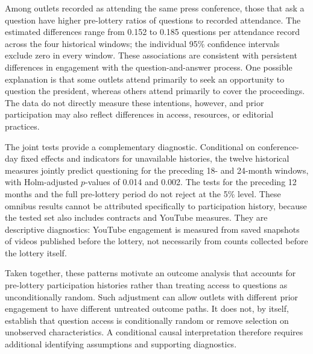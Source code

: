 Among outlets recorded as attending the same press conference, those that ask
a question have higher pre-lottery ratios of questions to recorded attendance.
The estimated differences range from 0.152 to 0.185 questions per attendance
record across the four historical windows; the individual 95\% confidence
intervals exclude zero in every window. These associations are consistent with
persistent differences in engagement with the question-and-answer process.
One possible explanation is that some outlets attend primarily to seek an
opportunity to question the president, whereas others attend primarily to
cover the proceedings. The data do not directly measure these intentions,
however, and prior participation may also reflect differences in access,
resources, or editorial practices.

The joint tests provide a complementary diagnostic. Conditional on conference-day
fixed effects and indicators for unavailable histories, the twelve historical
measures jointly predict questioning for the preceding 18- and 24-month windows,
with Holm-adjusted $p$-values of 0.014 and 0.002. The tests for the preceding
12 months and the full pre-lottery period do not reject at the 5\% level.
These omnibus results cannot be attributed specifically to participation
history, because the tested set also includes contracts and YouTube measures.
They are descriptive diagnostics: YouTube engagement is measured from saved
snapshots of videos published before the lottery, not necessarily from counts
collected before the lottery itself.

Taken together, these patterns motivate an outcome analysis that accounts for
pre-lottery participation histories rather than treating access to questions
as unconditionally random. Such adjustment can allow outlets with different
prior engagement to have different untreated outcome paths. It does not, by
itself, establish that question access is conditionally random or remove
selection on unobserved characteristics. A conditional causal interpretation
therefore requires additional identifying assumptions and supporting diagnostics.

